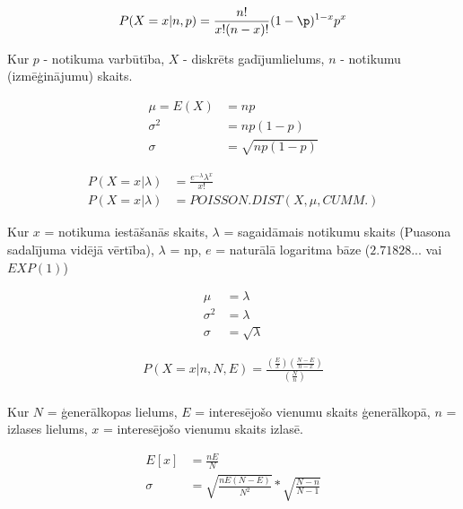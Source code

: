 {\begin{align*}
    P(X=x | n,p)=\displaystyle\frac{n!}{x!(n-x)!}(1-\p)^{1-x}p^x
\end{align*}

Kur $p$ - notikuma varbūtība, $X$ - diskrēts gadījumlielums, $n$ - notikumu
(izmēģinājumu) skaits.}


{\begin{align*}
    \mu = E(X) &= np \\
    \sigma^2 &= np(1-p) \\
    \sigma &= \sqrt{np(1-p)}
\end{align*}}


{\begin{align*}
    P(X=x|\lambda) &= \displaystyle\frac{e^{-\lambda}\lambda^x}{x!} \\
    P(X=x|\lambda) &= POISSON.DIST(X, \mu, CUMM.) 
\end{align*}

Kur $x$ = notikuma iestāšanās skaits, $\lambda$ = sagaidāmais notikumu skaits
(Puasona sadalījuma vidējā vērtība), $\lambda$ = np, $e$ = naturālā logaritma
bāze ($2.71828...$ vai $EXP(1)$)
}
{\begin{align*}
    \mu &= \lambda \\
    \sigma^2 &= \lambda \\
    \sigma &= \sqrt{\lambda}
\end{align*}
}

{\begin{align*}
    P(X=x|n,N,E)=\displaystyle\frac{(\frac{E}{x})(\frac{N-E}{n-x})}{(\frac{N}{n})} \\
\end{align*}

    Kur $N$ = ģenerālkopas lielums, $E$ = interesējošo vienumu skaits
    ģenerālkopā, $n$ = izlases lielums, $x$ = interesējošo vienumu skaits
    izlasē.
}


{\begin{align*}
    E[x]&=\displaystyle\frac{nE}{N} \\
    \sigma &= \sqrt{\displaystyle\frac{nE(N-E)}{N^2}}*\sqrt{\displaystyle\frac{N-n}{N-1}}
\end{align*}}
